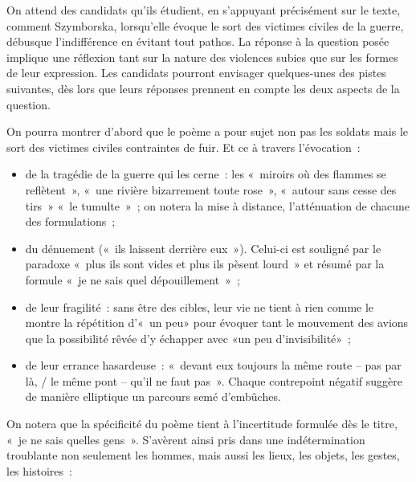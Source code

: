		{On attend des candidats qu'ils étudient, en s'appuyant précisément sur le texte,
comment Szymborska, lorsqu'elle évoque le sort des victimes civiles de la guerre,
débusque l'indifférence en évitant tout pathos. La réponse à la question posée
implique une réflexion tant sur la nature des violences subies que sur les formes de
leur expression. Les candidats pourront envisager quelques-unes des pistes
suivantes, dès lors que leurs réponses prennent en compte les deux aspects de la
question.

On pourra montrer d'abord que le poème a pour sujet non pas les soldats mais
le sort des victimes civiles contraintes de fuir. Et ce à travers l'évocation~:

\begin{itemize}
\item de la tragédie de la guerre qui les cerne~: les «~miroirs où des flammes se
reflètent~», «~une rivière bizarrement toute rose~», «~autour sans cesse des tirs~» «~le tumulte~»~; on notera la mise à distance, l'atténuation de chacune des formulations~;
\item du dénuement («~ils laissent derrière eux~»). Celui-ci est souligné par le
paradoxe «~plus ils sont vides et plus ils pèsent lourd~» et résumé par la formule «~je
ne sais quel dépouillement~»~;
\item de leur fragilité~: sans être des cibles, leur vie ne tient à rien comme le montre
la répétition d'«~un peu» pour évoquer tant le mouvement des avions que la possibilité
rêvée d'y échapper avec «un peu d'invisibilité»~;
\item de leur errance hasardeuse~: «~devant eux toujours la même route – pas par
là, / le même pont – qu'il ne faut pas~». Chaque contrepoint négatif suggère de manière
elliptique un parcours semé d'embûches.
\end{itemize}

On notera que la spécificité du poème tient à l'incertitude formulée dès le titre,
«~je ne sais quelles gens~». S'avèrent ainsi pris dans une indétermination troublante
non seulement les hommes, mais aussi les lieux, les objets, les gestes, les histoires~:

}
